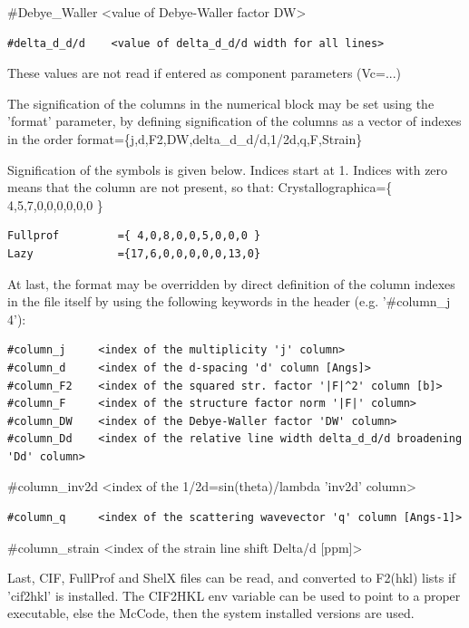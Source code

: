 \#Debye\_Waller \textless{}value of Debye-Waller factor DW\textgreater{}

\begin{verbatim}
#delta_d_d/d    <value of delta_d_d/d width for all lines>
\end{verbatim}

These values are not read if entered as component parameters (Vc=...)

The signification of the columns in the numerical block may be set using the 'format' parameter, by defining signification of the columns as a vector of indexes in the order format=\{j,d,F2,DW,delta\_d\_d/d,1/2d,q,F,Strain\}

Signification of the symbols is given below. Indices start at 1. Indices with zero means that the column are not present, so that: Crystallographica=\{ 4,5,7,0,0,0,0,0,0 \}

\begin{verbatim}
Fullprof         ={ 4,0,8,0,0,5,0,0,0 }
Lazy             ={17,6,0,0,0,0,0,13,0}
\end{verbatim}

At last, the format may be overridden by direct definition of the column indexes in the file itself by using the following keywords in the header (e.g. '\#column\_j 4'):

\begin{verbatim}
#column_j     <index of the multiplicity 'j' column>
#column_d     <index of the d-spacing 'd' column [Angs]>
#column_F2    <index of the squared str. factor '|F|^2' column [b]>
#column_F     <index of the structure factor norm '|F|' column>
#column_DW    <index of the Debye-Waller factor 'DW' column>
#column_Dd    <index of the relative line width delta_d_d/d broadening 'Dd' column>
\end{verbatim}

\#column\_inv2d \textless{}index of the 1/2d=sin(theta)/lambda 'inv2d' column\textgreater{}

\begin{verbatim}
#column_q     <index of the scattering wavevector 'q' column [Angs-1]>
\end{verbatim}

\#column\_strain \textless{}index of the strain line shift Delta/d [ppm]\textgreater{}

Last, CIF, FullProf and ShelX files can be read, and converted to F2(hkl) lists if 'cif2hkl' is installed. The CIF2HKL env variable can be used to point to a proper executable, else the McCode, then the system installed versions are used.

